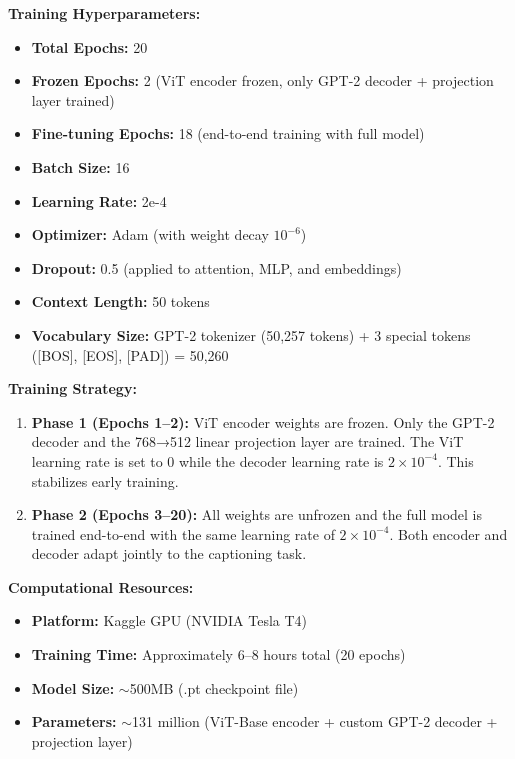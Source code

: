 \documentclass[12pt]{article}
\begin{document}
\begin{metricbox}
\textbf{Training Hyperparameters:}
\begin{itemize}
\item \textbf{Total Epochs:} 20
\item \textbf{Frozen Epochs:} 2 (ViT encoder frozen, only GPT-2 decoder + projection layer trained)
\item \textbf{Fine-tuning Epochs:} 18 (end-to-end training with full model)
\item \textbf{Batch Size:} 16
\item \textbf{Learning Rate:} 2e-4
\item \textbf{Optimizer:} Adam (with weight decay $10^{-6}$)
\item \textbf{Dropout:} 0.5 (applied to attention, MLP, and embeddings)
\item \textbf{Context Length:} 50 tokens
\item \textbf{Vocabulary Size:} GPT-2 tokenizer (50,257 tokens) + 3 special tokens ([BOS], [EOS], [PAD]) = 50,260
\end{itemize}
\end{metricbox}

\textbf{Training Strategy:}
\begin{enumerate}
\item \textbf{Phase 1 (Epochs 1--2):} ViT encoder weights are frozen. Only the GPT-2 decoder and the 768→512 linear projection layer are trained. The ViT learning rate is set to 0 while the decoder learning rate is $2\times10^{-4}$. This stabilizes early training.

\item \textbf{Phase 2 (Epochs 3--20):} All weights are unfrozen and the full model is trained end-to-end with the same learning rate of $2\times10^{-4}$. Both encoder and decoder adapt jointly to the captioning task.
\end{enumerate}

\textbf{Computational Resources:}
\begin{itemize}
\item \textbf{Platform:} Kaggle GPU (NVIDIA Tesla T4)
\item \textbf{Training Time:} Approximately 6--8 hours total (20 epochs)
\item \textbf{Model Size:} $\sim$500MB (.pt checkpoint file)
\item \textbf{Parameters:} $\sim$131 million (ViT-Base encoder + custom GPT-2 decoder + projection layer)
\end{itemize}
\end{document}
